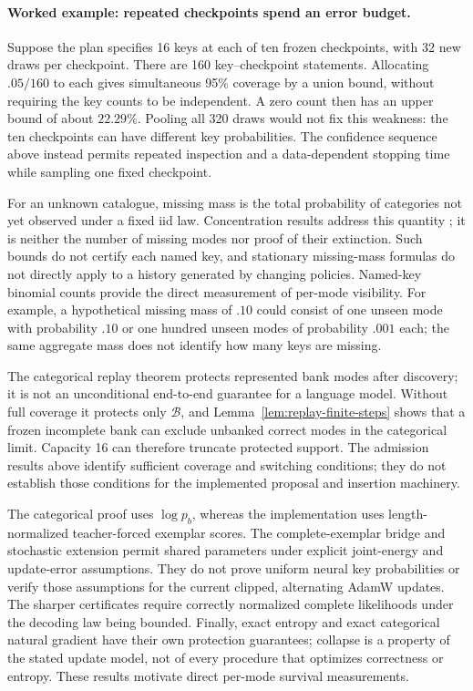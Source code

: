 \paragraph{Worked example: repeated checkpoints spend an error budget.}
Suppose the plan specifies 16 keys at each of ten frozen checkpoints, with
32 new draws per checkpoint. There are 160 key--checkpoint statements.
Allocating $.05/160$ to each gives simultaneous 95\% coverage by a union
bound, without requiring the key counts to be independent. A zero count then
has an upper bound of about $22.29\%$. Pooling all 320 draws would not fix
this weakness: the ten checkpoints can have different key probabilities.
The confidence sequence above instead permits repeated inspection and a
data-dependent stopping time while sampling one fixed checkpoint.

For an unknown catalogue, missing mass is the total probability of categories
not yet observed under a fixed iid law. Concentration results address this
quantity \citep{mcallester2003missing,berend2013missing}; it is neither the
number of missing modes nor proof of their extinction. Such bounds do not
certify each named key, and stationary missing-mass formulas do not directly
apply to a history generated by changing policies. Named-key binomial counts
provide the direct measurement of per-mode visibility.
For example, a hypothetical missing mass of $.10$ could consist of one
unseen mode with probability $.10$ or one hundred unseen modes of probability
$.001$ each; the same aggregate mass does not identify how many keys are missing.

\begin{remark}
The categorical replay theorem protects represented bank modes after discovery;
it is not an unconditional end-to-end guarantee for a language model.
Without full coverage it protects only $\mathcal B$, and
Lemma~\ref{lem:replay-finite-steps} shows that a frozen incomplete bank can
exclude unbanked correct modes in the categorical limit. Capacity 16 can
therefore truncate protected support. The admission results above identify
sufficient coverage and switching conditions; they do not establish those
conditions for the implemented proposal and insertion machinery.

The categorical proof uses $\log p_b$, whereas the implementation uses
length-normalized teacher-forced exemplar scores. The complete-exemplar bridge
and stochastic extension permit shared parameters under explicit joint-energy
and update-error assumptions. They do not prove uniform neural key
probabilities or verify those assumptions for the current clipped, alternating
AdamW updates. The sharper certificates require correctly normalized complete
likelihoods under the decoding law being bounded. Finally, exact entropy and
exact categorical natural gradient have their own protection guarantees;
collapse is a property of the stated update model, not of every procedure that
optimizes correctness or entropy. These results motivate direct per-mode survival measurements.
\end{remark}


